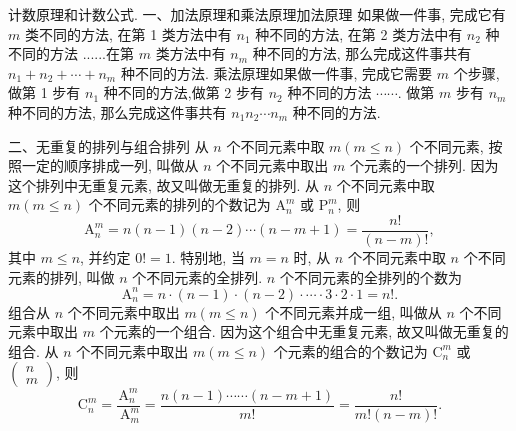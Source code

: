 
计数原理和计数公式.
一、加法原理和乘法原理加法原理 如果做一件事, 完成它有 $m$ 类不同的方法, 在第 1 类方法中有 $n_1$ 种不同的方法, 在第 2 类方法中有 $n_2$ 种不同的方法 ......在第 $m$ 类方法中有 $n_m$ 种不同的方法, 那么完成这件事共有 $n_1+n_2+\cdots+n_m$ 种不同的方法.
乘法原理如果做一件事, 完成它需要 $m$ 个步骤, 做第 1 步有 $n_1$ 种不同的方法,做第 2 步有 $n_2$ 种不同的方法 $\cdots \cdots$. 做第 $m$ 步有 $n_m$ 种不同的方法, 那么完成这件事共有 $n_1 n_2 \cdots n_m$ 种不同的方法.



二、无重复的排列与组合排列 从 $n$ 个不同元素中取 $m(m \leqslant n)$ 个不同元素, 按照一定的顺序排成一列, 叫做从 $n$ 个不同元素中取出 $m$ 个元素的一个排列.
因为这个排列中无重复元素, 故又叫做无重复的排列.
从 $n$ 个不同元素中取 $m(m \leqslant n)$ 个不同元素的排列的个数记为 $\mathrm{A}_n^m$ 或 $\mathrm{P}_n^m$, 则
$$
\mathrm{A}_n^m=n(n-1)(n-2) \cdots(n-m+1)=\frac{n !}{(n-m) !},
$$
其中 $m \leqslant n$, 并约定 $0 !=1$.
特别地, 当 $m=n$ 时, 从 $n$ 个不同元素中取 $n$ 个不同元素的排列, 叫做 $n$ 个不同元素的全排列.
$n$ 个不同元素的全排列的个数为
$$
\mathrm{A}_n^n=n \cdot(n-1) \cdot(n-2) \cdot \cdots \cdot 3 \cdot 2 \cdot 1=n ! .
$$
组合从 $n$ 个不同元素中取出 $m(m \leqslant n)$ 个不同元素并成一组, 叫做从 $n$ 个不同元素中取出 $m$ 个元素的一个组合.
因为这个组合中无重复元素, 故又叫做无重复的组合.
从 $n$ 个不同元素中取出 $m(m \leqslant n)$ 个元素的组合的个数记为 $\mathrm{C}_n^m$ 或 $\left(\begin{array}{c}n \\ m\end{array}\right)$, 则
$$
\mathrm{C}_n^m=\frac{\mathrm{A}_n^m}{\mathrm{~A}_m^m}=\frac{n(n-1) \cdots \cdots(n-m+1)}{m !}=\frac{n !}{m !(n-m) !} .
$$



